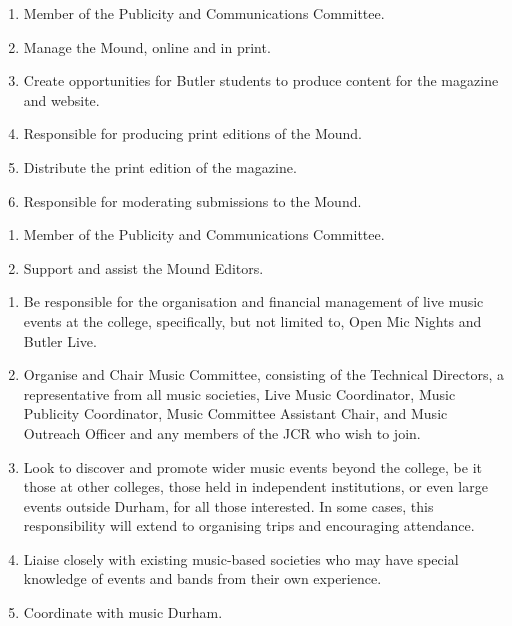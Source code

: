 \begin{enumerate}
    \item Member of the Publicity and Communications Committee.
    \item Manage the Mound, online and in print.
    \item Create opportunities for Butler students to produce content for the magazine and website.
    \item Responsible for producing print editions of the Mound.
    \item Distribute the print edition of the magazine. 
    \item Responsible for moderating submissions to the Mound.
    
\end{enumerate}

\begin{enumerate}
    \item Member of the Publicity and Communications Committee. \item Support and assist the Mound Editors.
\end{enumerate}

\begin{enumerate}
    \item Be responsible for the organisation and financial management of live music events at the college, specifically, but not limited to, Open Mic Nights and Butler Live.
    \item Organise and Chair Music Committee, consisting of the Technical Directors, a representative from all music societies, Live Music Coordinator, Music Publicity Coordinator, Music Committee Assistant Chair, and Music Outreach Officer and any members of the JCR who wish to join.
    \item Look to discover and promote wider music events beyond the college, be it those at other colleges, those held in independent institutions, or even large events outside Durham, for all those interested. In some cases, this responsibility will extend to organising trips and encouraging attendance.
    \item Liaise closely with existing music-based societies who may have special knowledge of events and bands from their own experience.
    \item Coordinate with music Durham.
    
\end{enumerate}

